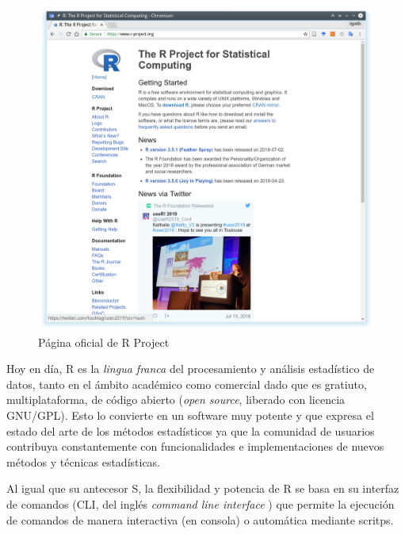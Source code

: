 \documentclass[a4paper]{book}
\begin{document}
\begin{figure}[h]

{\centering \includegraphics[width=0.75\linewidth,]{images/rproject} 

}

\caption{Página oficial de R Project}\label{fig:unnamed-chunk-2}
\end{figure}

Hoy en día, R es la \emph{lingua franca} del procesamiento y análisis
estadístico de datos, tanto en el ámbito académico como comercial dado
que es gratiuto, multiplataforma, de código abierto (\emph{open source},
liberado con licencia GNU/GPL). Esto lo convierte en un software muy
potente y que expresa el estado del arte de los métodos estadísticos ya
que la comunidad de usuarios contribuya constantemente con
funcionalidades e implementaciones de nuevos métodos y técnicas
estadísticas.

Al igual que su antecesor S, la flexibilidad y potencia de R se basa en
su interfaz de comandos (CLI, del inglés \emph{command line interface} )
que permite la ejecución de comandos de manera interactiva (en consola)
o automática mediante scritps.
\end{document}
